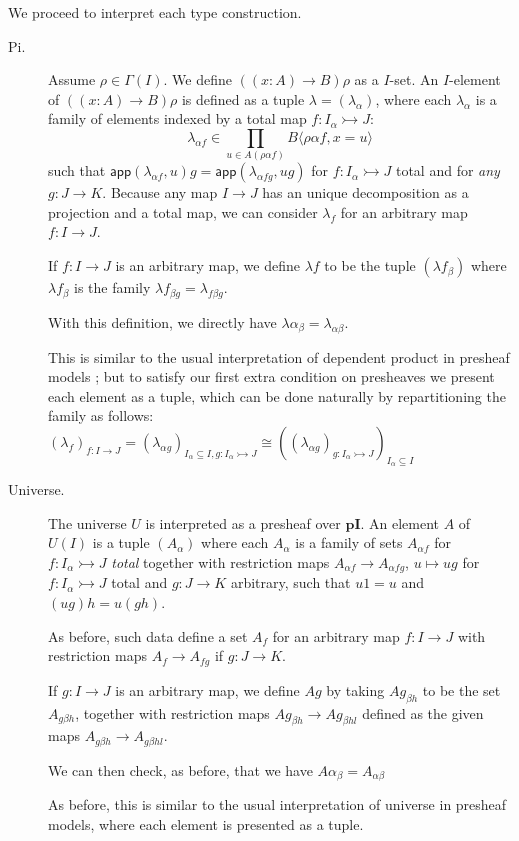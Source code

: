 \documentclass[english]{PaperTools/latex/lipics}
\def\pI{\ensuremath{\mathbf{pI}}}
\def\app#1#2{\mathsf{app}(#1,#2)}
\begin{document}
\bigskip
We proceed to interpret each type construction.
\begin{description}
  \item[\sc Pi.]
    Assume $ρ ∈ Γ(I)$. We define $((x:A) → B)ρ$ as a $I$-set.
    An $I$-element of $((x:A) → B)ρ$ is defined as a tuple $λ = (λ_α)$,
    where each $λ_α$ is a family of elements indexed by a total map $f : I_α ↣ J$:
    $$λ_{α f} ∈ \prod_{u ∈ A(ραf)} B⟨ραf,x=u⟩$$
    such that
    $\app{λ_{αf}}{u} g = \app{λ_{α fg}}{ug}$ for $f : I_α ↣ J$ total and
    for \emph{any} $g : J → K$.
    Because any map $I → J$ has an unique decomposition as a projection and a total
    map, we can consider $λ_f$ for an arbitrary map $f : I → J$.

    If $f : I → J$ is an arbitrary map, we define $λ f$ to be the tuple
    $(λf_β)$ where $λf_β$ is the family $λf_{βg} = λ_{fβg}$.

    With this definition, we directly have $λα_{β} = λ_{αβ}$.

    This is similar to the usual interpretation of dependent product in
    presheaf models \citep{Hofmann97syntaxand,bezem2014model}; but to
    satisfy our first extra condition on presheaves we present
    each element as a tuple, which can be done naturally by repartitioning
    the family as follows:
    $(λ_f)_{f : I → J} = (λ_{αg})_{I_α ⊆ I, g : I_α ↣ J} ≅
     ((λ_{αg})_{g : I_α ↣ J})_{I_α ⊆ I}$


  \item[\sc Universe.]
    The universe $U$ is interpreted as a presheaf over \pI. An element $A$ of
    $U(I)$ is a tuple $(A_α)$ where each $A_α$ is a family of sets
    $A_{α f}$ for $f : I_α ↣ J$ \emph{total} together with restriction
    maps $A_{α f} → A_{α fg}$, $u ↦ ug$ for $f : I_α ↣ J$ total
    and $g : J → K$ arbitrary, such that $u1 = u$ and $(ug)h = u(gh)$.

    As before, such data define a set $A_f$ for an arbitrary map $f : I → J$
    with restriction maps $A_f → A_{fg}$ if $g : J → K$.

    If $g : I → J$ is an arbitrary map, we define $Ag$ by taking $Ag_{βh}$
    to be the set $A_{gβh}$, together with restriction maps $Ag_{βh} → Ag_{βhl}$
    defined as the given maps $A_{gβh} → A_{gβhl}$.

    We can then check, as before, that we have $Aα_{β} = A_{αβ}$

    As before, this is similar to the usual interpretation of universe in
    presheaf models, where each element is presented as a tuple.



\end{description}
\end{document}
